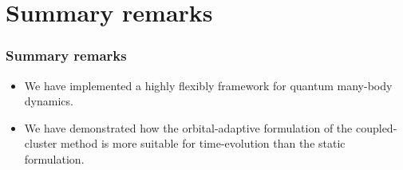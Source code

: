 \documentclass{beamer}
\begin{document}
\section{Summary remarks}

\begin{frame}
    \frametitle{Summary remarks}
    \begin{itemize}
        \item We have implemented a highly flexibly framework for quantum
            many-body dynamics.
        \item We have demonstrated how the orbital-adaptive formulation of
            the coupled-cluster method is more suitable for time-evolution than
            the static formulation.
    \end{itemize}
\end{frame}
\end{document}
